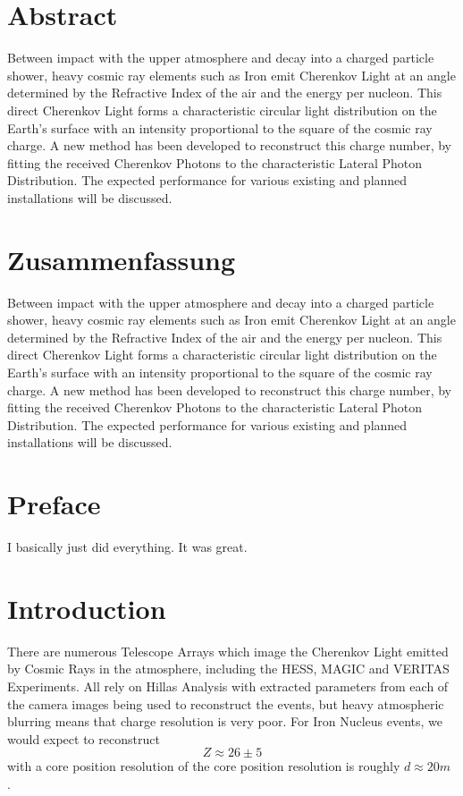 \documentclass{article}
\begin{document}
\section*{Abstract}
Between impact with the upper atmosphere and decay into a charged particle shower, heavy cosmic ray elements such as Iron emit Cherenkov Light at an angle determined by the Refractive Index of the air and the energy per nucleon. This direct Cherenkov Light forms a characteristic circular light distribution on the Earth's surface with an intensity proportional to the square of the cosmic ray charge. A new method has been developed to reconstruct this charge number, by fitting the received Cherenkov Photons to the characteristic Lateral Photon Distribution. The expected performance for various existing and planned installations will be discussed.

\section*{Zusammenfassung}
Between impact with the upper atmosphere and decay into a charged particle shower, heavy cosmic ray elements such as Iron emit Cherenkov Light at an angle determined by the Refractive Index of the air and the energy per nucleon. This direct Cherenkov Light forms a characteristic circular light distribution on the Earth's surface with an intensity proportional to the square of the cosmic ray charge. A new method has been developed to reconstruct this charge number, by fitting the received Cherenkov Photons to the characteristic Lateral Photon Distribution. The expected performance for various existing and planned installations will be discussed.
\newpage
\tableofcontents
\newpage

\section{Preface}
I basically just did everything. It was great.
\newpage

\section{Introduction}
There are numerous Telescope Arrays which image the Cherenkov Light emitted by Cosmic Rays in the atmosphere, including the HESS, MAGIC and VERITAS Experiments. All rely on Hillas Analysis with extracted parameters from each of the camera images being used to reconstruct the events, but heavy atmospheric blurring means that charge resolution is very poor. For Iron Nucleus events, we would expect to reconstruct \[Z \approx 26 \pm 5 \] with a core position resolution of the core position resolution is roughly $d \approx 20 m $ \cite{hess07}. 
\end{document}
